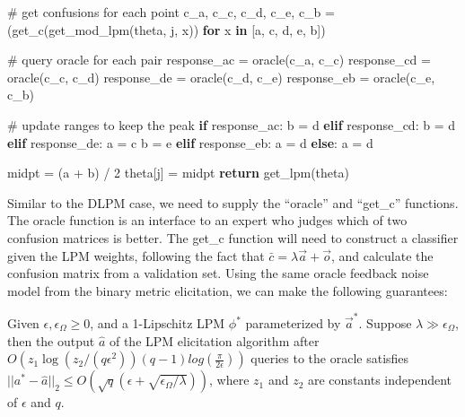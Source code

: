 \documentclass[
  letterpaper,
  numbers=noenddot,
  DIV=11,
  oneside]{scrreprt}
\newenvironment{Shaded}{\begin{snugshade}}{\end{snugshade}}
\newcommand{\CommentTok}[1]{\textcolor[rgb]{0.37,0.37,0.37}{#1}}
\newcommand{\ControlFlowTok}[1]{\textcolor[rgb]{0.00,0.23,0.31}{\textbf{#1}}}
\newcommand{\DecValTok}[1]{\textcolor[rgb]{0.68,0.00,0.00}{#1}}
\newcommand{\KeywordTok}[1]{\textcolor[rgb]{0.00,0.23,0.31}{\textbf{#1}}}
\newcommand{\NormalTok}[1]{\textcolor[rgb]{0.00,0.23,0.31}{#1}}
\newcommand{\OperatorTok}[1]{\textcolor[rgb]{0.37,0.37,0.37}{#1}}
\theoremstyle{remark}
\begin{document}
\begin{Shaded}
\begin{Highlighting}[numbers=left,,]
            \CommentTok{\# get confusions for each point}
\NormalTok{            c\_a, c\_c, c\_d, c\_e, c\_b }\OperatorTok{=}\NormalTok{ (get\_c(get\_mod\_lpm(theta, j, x)) }
                \ControlFlowTok{for}\NormalTok{ x }\KeywordTok{in}\NormalTok{ [a, c, d, e, b])}

            \CommentTok{\# query oracle for each pair}
\NormalTok{            response\_ac }\OperatorTok{=}\NormalTok{ oracle(c\_a, c\_c)}
\NormalTok{            response\_cd }\OperatorTok{=}\NormalTok{ oracle(c\_c, c\_d)}
\NormalTok{            response\_de }\OperatorTok{=}\NormalTok{ oracle(c\_d, c\_e)}
\NormalTok{            response\_eb }\OperatorTok{=}\NormalTok{ oracle(c\_e, c\_b)}

            \CommentTok{\# update ranges to keep the peak}
            \ControlFlowTok{if}\NormalTok{ response\_ac:}
\NormalTok{                b }\OperatorTok{=}\NormalTok{ d}
            \ControlFlowTok{elif}\NormalTok{ response\_cd:}
\NormalTok{                b }\OperatorTok{=}\NormalTok{ d}
            \ControlFlowTok{elif}\NormalTok{ response\_de:}
\NormalTok{                a }\OperatorTok{=}\NormalTok{ c}
\NormalTok{                b }\OperatorTok{=}\NormalTok{ e}
            \ControlFlowTok{elif}\NormalTok{ response\_eb:}
\NormalTok{                a }\OperatorTok{=}\NormalTok{ d}
            \ControlFlowTok{else}\NormalTok{:}
\NormalTok{                a }\OperatorTok{=}\NormalTok{ d}

\NormalTok{        midpt }\OperatorTok{=}\NormalTok{ (a }\OperatorTok{+}\NormalTok{ b) }\OperatorTok{/} \DecValTok{2}
\NormalTok{        theta[j] }\OperatorTok{=}\NormalTok{ midpt}
    \ControlFlowTok{return}\NormalTok{ get\_lpm(theta)}
\end{Highlighting}
\end{Shaded}

Similar to the DLPM case, we need to supply the ``oracle'' and
``get\_c'' functions. The oracle function is an interface to an expert
who judges which of two confusion matrices is better. The get\_c
function will need to construct a classifier given the LPM weights,
following the fact that \(\bar{c} = \lambda \vec{a} + \vec{o}\), and
calculate the confusion matrix from a validation set. Using the same
oracle feedback noise model from the binary metric elicitation, we can
make the following guarantees:

Given \(\epsilon, \epsilon_\Omega \geq 0\), and a 1-Lipschitz LPM
\(\phi^*\) parameterized by \(\vec{a}^*\). Suppose
\(\lambda \gg \epsilon_\Omega\), then the output \(\hat{a}\) of the LPM
elicitation algorithm after
\(O(z_1 \log(z_2/(q\epsilon^2))(q-1) log(\frac{\pi}{2\epsilon}))\)
queries to the oracle satisfies
\(||a^* - \hat{a}||_2 \leq O(\sqrt{q}(\epsilon + \sqrt{\epsilon_\Omega/\lambda}))\),
where \(z_1\) and \(z_2\) are constants independent of \(\epsilon\) and
\(q\).
\end{document}
